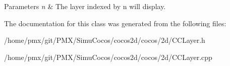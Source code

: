 \begin{DoxyParams}{Parameters}
{\em n} & The layer indexed by n will display. \\
\hline
\end{DoxyParams}


The documentation for this class was generated from the following files\+:\begin{DoxyCompactItemize}
\item 
/home/pmx/git/\+P\+M\+X/\+Simu\+Cocos/cocos2d/cocos/2d/C\+C\+Layer.\+h\item 
/home/pmx/git/\+P\+M\+X/\+Simu\+Cocos/cocos2d/cocos/2d/C\+C\+Layer.\+cpp\end{DoxyCompactItemize}

